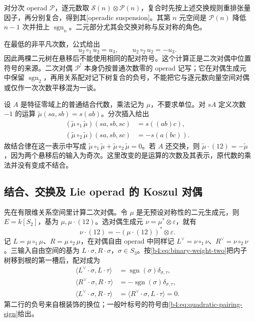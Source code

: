 对分次 operad \(\mathcal P\)，逐元数取 \(\mathcal S(n)\otimes\mathcal P(n)\)，复合时先按上述交换规则重排张量因子，再分别复合，得到其[operadic suspension]。其第 \(n\) 元空间是 \(\mathcal P(n)\) 降低 \(n-1\) 次并扭上 \(\operatorname{sgn}_n\)。二元部分尤其会交换对称与反对称的角色。

\ProseParagraphBreak
在最低的非平凡次数，公式给出
\[
	u_2\circ_1u_2=u_3,\qquad u_2\circ_2u_2=-u_3.
\]
因此两棵二元树在悬移后不能使用相同的配对符号。这个计算正是二次对偶中位置符号的来源。二次对偶 \(\mathcal P^!\) 本身仍按普通次数零的 operad 记写；它在对偶生成元中保留 \(\operatorname{sgn}_2\)，再用关系配对记下树复合的负号，不能把它与逐元数向量空间对偶或仅作一次次数平移混为一谈。

\begin{example}\label{b4:exm:suspended-associativity}
	设 \(A\) 是特征零域上的普通结合代数，乘法记为 \(\mu\)，不要求单位。对 \(sA\) 定义次数 \(-1\) 的运算 \(\widetilde\mu(sa,sb)=s(ab)\)。分次插入给出
	\[
		\begin{aligned}
			(\widetilde\mu\circ_1\widetilde\mu)(sa,sb,sc)&=s((ab)c),\\
			(\widetilde\mu\circ_2\widetilde\mu)(sa,sb,sc)&=-s(a(bc)).
		\end{aligned}
	\]
	故结合律在这一表示中写成 \(\widetilde\mu\circ_1\widetilde\mu+\widetilde\mu\circ_2\widetilde\mu=0\)。若 \(A\) 还交换，则 \(\widetilde\mu\cdot(12)=-\widetilde\mu\)，因为两个悬移后的输入为奇次。这里改变的是运算的次数及其表示，原代数的乘法并没有变成不结合。
\end{example}

\subsection{结合、交换及 Lie operad 的 Koszul 对偶}
\label{b4:subsec:G03:03}

先在有限维关系空间里计算二次对偶。令 \(\mu\) 是无预设对称性的二元生成元，则 \(E=k[S_2]\)，基为 \(\mu,\mu\cdot(12)\)。选对偶生成元 \(\nu=\mu^*\otimes\varepsilon\)，就有
\[
	\nu\cdot(12)=-(\mu\cdot(12))^*\otimes\varepsilon.
\]
记 \(L=\mu\circ_1\mu\)、\(R=\mu\circ_2\mu\)，在对偶自由 operad 中同样记 \(L^\vee=\nu\circ_1\nu\)、\(R^\vee=\nu\circ_2\nu\)。三输入自由空间的基为 \(L\cdot\sigma,R\cdot\sigma\)，\(\sigma\in S_3\)。按\eqref{b4:eq:binary-weight-two}把内子树移到根的第一槽后，配对成为
\begin{equation}\label{b4:eq:ass-dual-pairing}
	\begin{aligned}
		\langle L^\vee\cdot\sigma,L\cdot\tau\rangle&=\operatorname{sgn}(\sigma)\delta_{\sigma,\tau},\\
		\langle R^\vee\cdot\sigma,R\cdot\tau\rangle&=-\operatorname{sgn}(\sigma)\delta_{\sigma,\tau},\\
		\langle L^\vee\cdot\sigma,R\cdot\tau\rangle&=\langle R^\vee\cdot\sigma,L\cdot\tau\rangle=0.
	\end{aligned}
\end{equation}
第二行的负号来自根装饰的换位；一般叶标号的符号由\eqref{b4:eq:quadratic-pairing-sign}给出。

